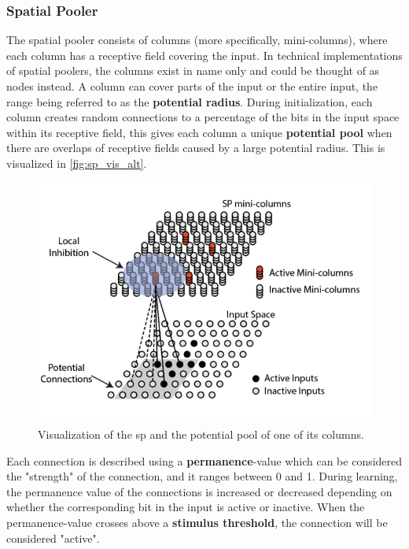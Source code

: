 \subsubsection{Spatial Pooler}
\label{sec:spatial_pooler}
The spatial pooler consists of columns (more specifically, mini-columns), where each column has a receptive field covering the input. In technical implementations of spatial poolers, the columns exist in name only and could be thought of as nodes instead. A column can cover parts of the input or the entire input, the range being referred to as the \textbf{potential radius}. During initialization, each column creates random connections to a percentage of the bits in the input space within its receptive field, this gives each column a unique \textbf{potential pool} when there are overlaps of receptive fields caused by a large potential radius. This is visualized in \autoref{fig:sp_vis_alt}.\par
\begin{figure}[htb]
    \centering
    \includegraphics[width=0.8\linewidth]{resources/related_works/sp_vis_alt}
    \caption[Spatial Pooler Visualization]{Visualization of the \gls*{sp} and the potential pool of one of its columns.}
    \label{fig:sp_vis_alt}
\end{figure}
\par
Each connection is described using a \textbf{permanence}-value which can be considered the "strength" of the connection, and it ranges between 0 and 1. During learning, the permanence value of the connections is increased or decreased depending on whether the corresponding bit in the input is active or inactive. When the permanence-value crosses above a \textbf{stimulus threshold}, the connection will be considered "active".

